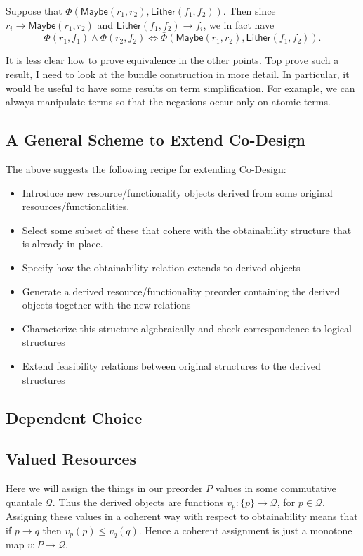 \documentclass[12pt]{article}
\theoremstyle{definition}
\theoremstyle{plain}
\theoremstyle{plain}
\theoremstyle{plain}
\theoremstyle{plain}
\theoremstyle{remark}
\theoremstyle{remark}
\begin{document}
Suppose that $\bar\Phi(\mathsf{Maybe}(r_1,r_2),\mathsf{Either}(f_1,f_2))$. Then since $r_i \rightarrow \mathsf{Maybe}(r_1,r_2)$ and $\mathsf{Either}(f_1,f_2) \rightarrow f_i$, we in fact have $$\Phi(r_1,f_1) \wedge \Phi(r_2,f_2) \Leftrightarrow \bar\Phi(\mathsf{Maybe}(r_1,r_2),\mathsf{Either}(f_1,f_2)).$$

It is less clear how to prove equivalence in the other points. Top prove such a result, I need to look at the bundle construction in more detail. In particular, it would be useful to have some results on term simplification. For example, we can always manipulate terms so that the negations occur only on atomic terms.

\subsection{A General Scheme to Extend Co-Design}

The above suggests the following recipe for extending Co-Design:
\begin{itemize}
	\item Introduce new resource/functionality objects derived from some original resources/functionalities. 
	\item Select some subset of these that cohere with the obtainability structure that is already in place.
	\item Specify how the obtainability relation extends to derived objects
	\item Generate a derived resource/functionality preorder containing the derived objects together with the new relations
	\item Characterize this structure algebraically and check correspondence to logical structures
	\item Extend feasibility relations between original structures to the derived structures
\end{itemize}

\subsection{Dependent Choice}


\subsection{Valued Resources}
Here we will assign the things in our preorder $P$ values in some commutative quantale $\mathcal{Q}$. Thus the derived objects are functions $v_p:\{p\} \rightarrow \mathcal{Q}$, for $p \in \mathcal{Q}$. Assigning these values in a coherent way with respect to obtainability means that if $p \rightarrow q$ then $v_p(p) \leq v_q(q)$. Hence a coherent assignment is just a monotone map $v: P \rightarrow \mathcal{Q}$.
\end{document}
